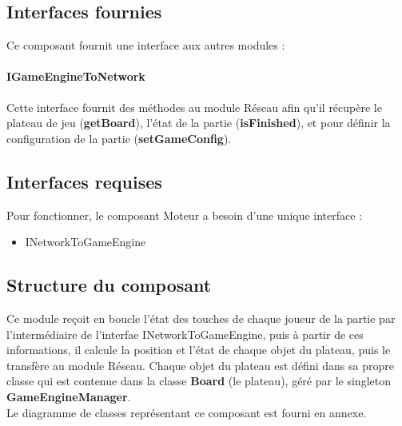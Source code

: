 \subsection{Interfaces fournies}

Ce composant fournit une interface aux autres modules :

\paragraph{IGameEngineToNetwork}

Cette interface fournit des méthodes au module Réseau afin qu'il récupère le plateau de jeu (\textbf{getBoard}), l'état de la partie (\textbf{isFinished}), et pour définir la configuration de la partie (\textbf{setGameConfig}).

\subsection{Interfaces requises}

Pour fonctionner, le composant Moteur a besoin d'une unique interface :
\begin{itemize}
    \item INetworkToGameEngine
\end{itemize}

\subsection{Structure du composant}

Ce module reçoit en boucle l'état des touches de chaque joueur de la partie par l'intermédiaire de l'interfae INetworkToGameEngine, puis à partir de ces informations, il calcule la position et l'état de chaque objet du plateau, puis le transfère au module Réseau. Chaque objet du plateau est défini dans sa propre classe qui est contenue dans la classe \textbf{Board} (le plateau), géré par le singleton \textbf{GameEngineManager}.\\

Le diagramme de classes représentant ce composant est fourni en annexe.
